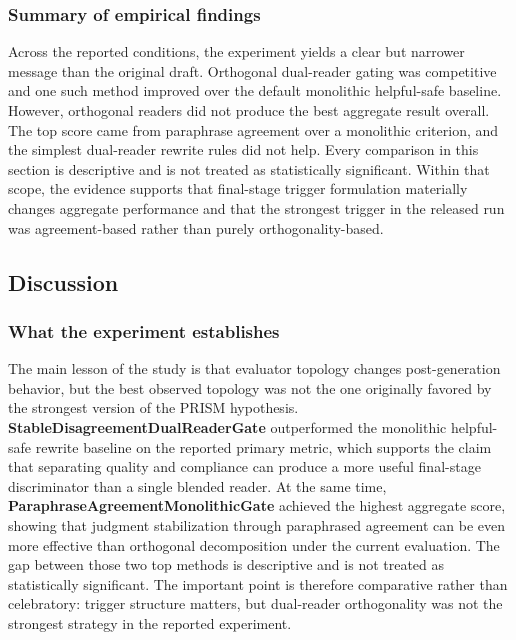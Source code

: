 \documentclass{article}
\begin{document}
\subsubsection{Summary of empirical findings}

\label{sec:summary_of_empirical_findings}

Across the reported conditions, the experiment yields a clear but narrower message than the original draft. Orthogonal dual-reader gating was competitive and one such method improved over the default monolithic helpful-safe baseline. However, orthogonal readers did not produce the best aggregate result overall. The top score came from paraphrase agreement over a monolithic criterion, and the simplest dual-reader rewrite rules did not help. Every comparison in this section is descriptive and is not treated as statistically significant. Within that scope, the evidence supports that final-stage trigger formulation materially changes aggregate performance and that the strongest trigger in the released run was agreement-based rather than purely orthogonality-based.

\subsection{Discussion}

\label{sec:discussion}

\subsubsection{What the experiment establishes}

\label{sec:what_the_experiment_establishes}

The main lesson of the study is that evaluator topology changes post-generation behavior, but the best observed topology was not the one originally favored by the strongest version of the PRISM hypothesis. \textbf{StableDisagreementDualReaderGate} outperformed the monolithic helpful-safe rewrite baseline on the reported primary metric, which supports the claim that separating quality and compliance can produce a more useful final-stage discriminator than a single blended reader. At the same time, \textbf{ParaphraseAgreementMonolithicGate} achieved the highest aggregate score, showing that judgment stabilization through paraphrased agreement can be even more effective than orthogonal decomposition under the current evaluation. The gap between those two top methods is descriptive and is not treated as statistically significant. The important point is therefore comparative rather than celebratory: trigger structure matters, but dual-reader orthogonality was not the strongest strategy in the reported experiment.
\end{document}
